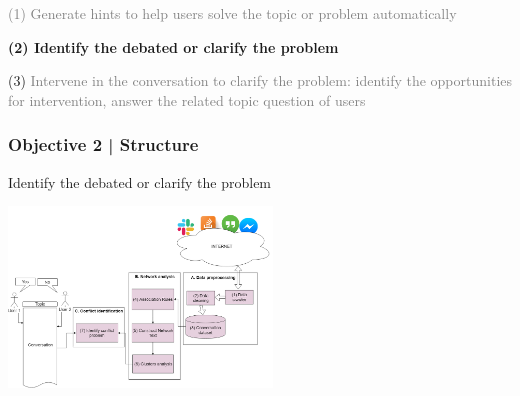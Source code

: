\documentclass{beamer}
\begin{document}

\begin{frame}
\par 	\textcolor{gray}{(1)  Generate hints to help users solve the topic or problem automatically}
\par \textbf{(2) Identify the debated or clarify the problem }
\par (3) \textcolor{gray}{ Intervene in the conversation to clarify the problem: identify the opportunities for intervention, answer the related topic question of users }
\end{frame}
\begin{frame}
\frametitle{Objective 2 | Structure}

Identify the debated or clarify the problem
\begin{center}
	\includegraphics[width=70mm]{32.png}
\end{center}

\end{frame}
\end{document}
